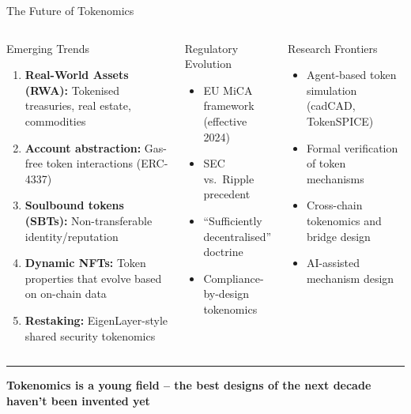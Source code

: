 \documentclass[8pt,aspectratio=169]{beamer}
\newcommand{\bottomnote}[1]{\vfill\vspace{-2mm}\textcolor{mllavender2}{\rule{\textwidth}{0.4pt}}\vspace{1mm}\footnotesize\textbf{#1}}
\begin{document}
\begin{frame}{The Future of Tokenomics}
\begin{columns}[T]
\begin{block}{Emerging Trends}
\footnotesize
\begin{enumerate}
  \item \textbf{Real-World Assets (RWA):} Tokenised treasuries, real estate, commodities
  \item \textbf{Account abstraction:} Gas-free token interactions (ERC-4337)
  \item \textbf{Soulbound tokens (SBTs):} Non-transferable identity/reputation
  \item \textbf{Dynamic NFTs:} Token properties that evolve based on on-chain data
  \item \textbf{Restaking:} EigenLayer-style shared security tokenomics
\end{enumerate}
\end{block}

\begin{block}{Regulatory Evolution}
\footnotesize
\begin{itemize}
  \item EU MiCA framework (effective 2024)
  \item SEC vs.\ Ripple precedent
  \item ``Sufficiently decentralised'' doctrine
  \item Compliance-by-design tokenomics
\end{itemize}
\end{block}
\vspace{2mm}
\begin{exampleblock}{\footnotesize Research Frontiers}
\footnotesize
\begin{itemize}
  \item Agent-based token simulation (cadCAD, TokenSPICE)
  \item Formal verification of token mechanisms
  \item Cross-chain tokenomics and bridge design
  \item AI-assisted mechanism design
\end{itemize}
\end{exampleblock}
\end{columns}
\bottomnote{Tokenomics is a young field -- the best designs of the next decade haven't been invented yet}
\end{frame}
\end{document}
